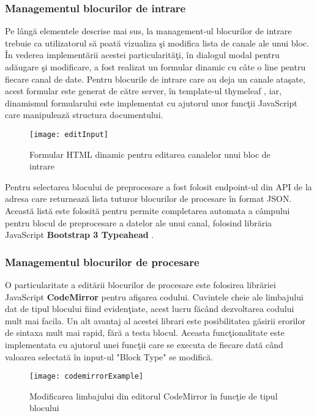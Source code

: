 \subsubsection{Managementul blocurilor de intrare}
Pe lângă elementele descrise mai sus, la management-ul blocurilor de intrare trebuie ca utilizatorul să poată vizualiza şi modifica lista de canale ale unui bloc. În vederea implementării acestei particularităţi, în dialogul modal pentru adăugare şi modificare, a fost realizat un formular dinamic cu câte o line pentru fiecare canal de date. Pentru blocurile de intrare care au deja un canale ataşate, acest formular este generat de către server, în template-ul thymeleaf , iar, dinamismul formularului este implementat cu ajutorul unor funcţii JavaScript care manipulează structura documentului.
\begin{figure}[H]
	\centering
	\texttt{[image: editInput]}
	\caption{Formular HTML dinamic pentru editarea canalelor unui bloc de intrare }
	\label{fig:editInput}
\end{figure}
Pentru selectarea blocului de preprocesare a fost folosit endpoint-ul din API de la adresa  care returnează lista tuturor blocurilor de procesare în format JSON. Această listă este folosită pentru permite completarea automata a câmpului pentru blocul de preprocesare a datelor ale unui canal, folosind librăria JavaScript \textbf{Bootstrap 3 Typeahead} \autocite{typeahead}.

\subsubsection{Managementul blocurilor de procesare}
O particularitate a editării blocurilor de procesare este folosirea librăriei JavaScript \textbf{CodeMirror}\autocite{codemirror} pentru afişarea codului. Cuvintele cheie ale limbajului dat de tipul blocului fiind evidenţiate, acest lucru făcând dezvoltarea codului mult mai facila. Un alt avantaj al acestei librari este posibilitatea găsirii erorilor de sintaxa mult mai rapid, fără a testa blocul. Aceasta funcţionalitate este implementata cu ajutorul unei funcţii care se executa de fiecare dată când valoarea selectată în input-ul "Block Type" se modifică.
\begin{figure}[H]
	\centering
	\texttt{[image: codemirrorExample]}
	\caption{Modificarea limbajului din editorul CodeMirror în funcţie de tipul blocului}
	\label{fig:codemirrorExample}
\end{figure}
